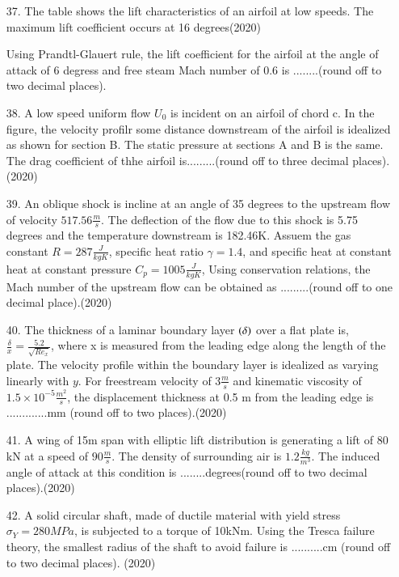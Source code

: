 \documentclass[journal]{IEEEtran}
\begin{document}
\begin{enumerate}
    \item[37.] The table shows the lift characteristics of an airfoil at low speeds. The maximum lift coefficient occurs at 16 degrees\hfill (2020)
    \newpage
    \begin{table}
        \centering
        \caption{}
    \end{table}
    Using Prandtl-Glauert rule, the lift coefficient for the airfoil at the angle of attack of 6 degress and free steam Mach number of 0.6 is ........(round off to two decimal places).
    \item[38.] A low speed uniform flow $U_0$ is incident on an airfoil of chord c. In the figure, the velocity profilr some distance downstream of the airfoil is idealized as shown for section B. The static pressure at sections A and B is the same. The drag coefficient of thhe airfoil is.........(round off to three decimal places).\hfill (2020)
    \begin{figure}[!ht]
        \centering
        \caption{}
    \end{figure}
    \item[39.] An oblique shock is incline at an angle of 35 degrees to the upstream flow of velocity $517.56\frac{m}{s}$. The deflection of the flow due to this shock is 5.75 degrees and the temperature downstream is 182.46K. Assuem the gas constant $R=287\frac{J}{kg K}$, specific heat ratio $\gamma = 1.4$, and specific heat at constant heat at constant pressure $C_p = 1005\frac{J}{kg K}$, Using conservation relations, the Mach number of the upstream flow can be obtained as .........(round off to one decimal place).\hfill (2020)
    \item[40.] The thickness of a laminar boundary layer $\left(\delta\right)$ over a flat plate is, $\frac{\delta}{x} = \frac{5.2}{\sqrt{Re_x}}$, where x is measured from the leading edge along the length of the plate. The velocity profile within the boundary layer is idealized as varying linearly with $y$.  For freestream velocity of $3\frac{m}{s}$ and kinematic viscosity of $1.5\times 10^{-5}\frac{m^2}{s}$, the displacement thickness at 0.5 m from the leading edge is .............mm (round off to two places).\hfill (2020)
    \item[41.] A wing of 15m span with elliptic lift distribution is generating a lift of 80 kN at a speed of $90\frac{m}{s}$. The density of surrounding air is $1.2\frac{kg}{m^3}$. The induced angle of attack at this condition is ........degrees(round off to two decimal places).\hfill (2020)
    \item[42.] A solid circular shaft, made of ductile material with yield stress $\sigma_Y = 280MPa$, is subjected to a torque of 10kNm. Using the Tresca failure theory, the smallest radius of the shaft to avoid failure is ..........cm (round off to two decimal places). \hfill (2020)
     
\end{enumerate}
\end{document}
